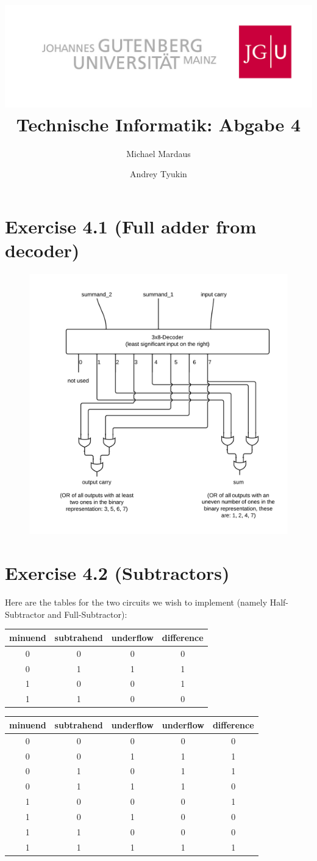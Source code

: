 \documentclass[10pt,a4paper]{scrartcl}
\author{Michael Mardaus \and Andrey Tyukin}
\title{\includegraphics[scale=0.2]{../logo_schriftzug}\\
Technische Informatik: Abgabe 4}
\newcommand{\subExercise}[1]{\vspace{0.5em} \noindent{\bf #1)}}
\begin{document}
\maketitle

\section*{Exercise 4.1 (Full adder from decoder)}

\vspace{1em}
\begin{figure}[h]
  \centering\includegraphics[width=0.6\linewidth]{images/fullAdder.png}
\end{figure}
\vspace{1em}

\FloatBarrier
\newpage
\section*{Exercise 4.2 (Subtractors)}
\subExercise{a}
Here are the tables for the two circuits we wish to implement 
(namely Half-Subtractor and Full-Subtractor):

\vspace{0.5em}
\begin{tabular}{|c c|c c|}
  \hline
  minuend & subtrahend & underflow & difference \\
  \hline
  0 & 0 & 0 & 0 \\
  0 & 1 & 1 & 1 \\
  1 & 0 & 0 & 1 \\
  1 & 1 & 0 & 0 \\
  \hline
\end{tabular}

\vspace{0.5em}
\begin{tabular}{|c c c|c c|}
  \hline
  minuend & subtrahend & underflow & underflow & difference \\
  \hline
  0 & 0 & 0 & 0 & 0 \\
  0 & 0 & 1 & 1 & 1 \\ 
  0 & 1 & 0 & 1 & 1 \\ 
  0 & 1 & 1 & 1 & 0 \\ 
  1 & 0 & 0 & 0 & 1 \\ 
  1 & 0 & 1 & 0 & 0 \\ 
  1 & 1 & 0 & 0 & 0 \\ 
  1 & 1 & 1 & 1 & 1 \\ 
  \hline
\end{tabular}
\end{document}
